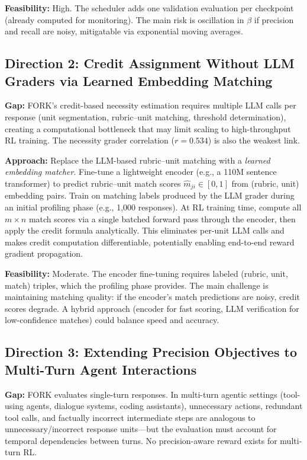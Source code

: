 \documentclass[11pt,a4paper]{article}
\begin{document}
\textbf{Feasibility:} High. The scheduler adds one validation evaluation per checkpoint (already computed for monitoring). The main risk is oscillation in $\beta$ if precision and recall are noisy, mitigatable via exponential moving averages.

\subsection{Direction 2: Credit Assignment Without LLM Graders via Learned Embedding Matching}
\textbf{Gap:} FORK's credit-based necessity estimation requires multiple LLM calls per response (unit segmentation, rubric--unit matching, threshold determination), creating a computational bottleneck that may limit scaling to high-throughput RL training. The necessity grader correlation ($r = 0.534$) is also the weakest link.

\textbf{Approach:} Replace the LLM-based rubric--unit matching with a \emph{learned embedding matcher}. Fine-tune a lightweight encoder (e.g., a 110M sentence transformer) to predict rubric--unit match scores $\hat{m}_{ji} \in [0,1]$ from (rubric, unit) embedding pairs. Train on matching labels produced by the LLM grader during an initial profiling phase (e.g., 1,000 responses). At RL training time, compute all $m \times n$ match scores via a single batched forward pass through the encoder, then apply the credit formula analytically. This eliminates per-unit LLM calls and makes credit computation differentiable, potentially enabling end-to-end reward gradient propagation.

\textbf{Feasibility:} Moderate. The encoder fine-tuning requires labeled (rubric, unit, match) triples, which the profiling phase provides. The main challenge is maintaining matching quality: if the encoder's match predictions are noisy, credit scores degrade. A hybrid approach (encoder for fast scoring, LLM verification for low-confidence matches) could balance speed and accuracy.

\subsection{Direction 3: Extending Precision Objectives to Multi-Turn Agent Interactions}
\textbf{Gap:} FORK evaluates single-turn responses. In multi-turn agentic settings (tool-using agents, dialogue systems, coding assistants), unnecessary actions, redundant tool calls, and factually incorrect intermediate steps are analogous to unnecessary/incorrect response units---but the evaluation must account for temporal dependencies between turns. No precision-aware reward exists for multi-turn RL.
\end{document}
